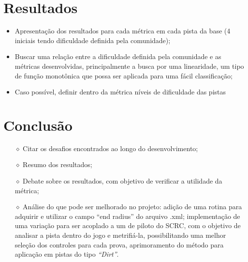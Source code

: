 \documentclass{article}
\begin{document}
\section{Resultados}
	\begin{itemize}
		\item Apresentação dos resultados para cada métrica em cada pista da base (4 iniciais \cite{berniw} tendo dificuldade definida pela comunidade);
		\item Buscar uma relação entre a dificuldade definida pela comunidade e as métricas desenvolvidas, principalmente a busca por uma linearidade, um tipo de função monotônica que possa ser aplicada para uma fácil classificação;
		\item Caso possível, definir dentro da métrica níveis de dificuldade das pistas 
	\end{itemize}


\section{Conclusão}
	\begin{itemize}
		\item[$\diamond$] Citar os desafios encontrados ao longo do desenvolvimento;
		\item[$\diamond$] Resumo dos resultados;
		\item[$\diamond$] Debate sobre os resultados, com objetivo de verificar a utilidade da métrica;
		\item[$\diamond$] Análise do que pode ser melhorado no projeto: adição de uma rotina para adquirir e utilizar o campo ``end radius'' do arquivo .xml; implementação de uma variação para ser acoplado a um de piloto do SCRC, com o objetivo de analisar a pista dentro do jogo e metrifiá-la, possibilitando uma melhor seleção dos controles para cada prova, aprimoramento do método para aplicação em pistas do tipo \textit{``Dirt''}. 
	\end{itemize}


{}

\end{document}
